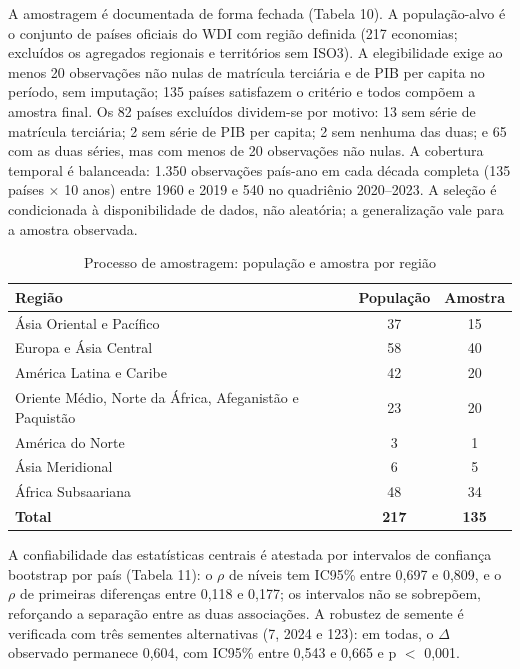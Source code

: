 \documentclass[12pt,a4paper]{article}
\begin{document}
A amostragem é documentada de forma fechada (Tabela 10). A população-alvo é o conjunto de países oficiais do WDI com região definida (217 economias; excluídos os agregados regionais e territórios sem ISO3). A elegibilidade exige ao menos 20 observações não nulas de matrícula terciária e de PIB per capita no período, sem imputação; 135 países satisfazem o critério e todos compõem a amostra final. Os 82 países excluídos dividem-se por motivo: 13 sem série de matrícula terciária; 2 sem série de PIB per capita; 2 sem nenhuma das duas; e 65 com as duas séries, mas com menos de 20 observações não nulas. A cobertura temporal é balanceada: 1.350 observações país-ano em cada década completa (135 países $\times$ 10 anos) entre 1960 e 2019 e 540 no quadriênio 2020--2023. A seleção é condicionada à disponibilidade de dados, não aleatória; a generalização vale para a amostra observada.

\begin{table}[htbp]
\centering
\caption{Processo de amostragem: população e amostra por região}
\label{tab:amostragem}
\small
\begin{tabular}{>{\raggedright\arraybackslash}p{6.0cm}cc}
\toprule
Região & População & Amostra \\
\midrule
Ásia Oriental e Pacífico & 37 & 15 \\
Europa e Ásia Central & 58 & 40 \\
América Latina e Caribe & 42 & 20 \\
Oriente Médio, Norte da África, Afeganistão e Paquistão & 23 & 20 \\
América do Norte & 3 & 1 \\
Ásia Meridional & 6 & 5 \\
África Subsaariana & 48 & 34 \\
\textbf{Total} & \textbf{217} & \textbf{135} \\
\bottomrule
\end{tabular}
\par{}
\end{table}

A confiabilidade das estatísticas centrais é atestada por intervalos de confiança bootstrap por país (Tabela 11): o $\rho$ de níveis tem IC95\% entre 0,697 e 0,809, e o $\rho$ de primeiras diferenças entre 0,118 e 0,177; os intervalos não se sobrepõem, reforçando a separação entre as duas associações. A robustez de semente é verificada com três sementes alternativas (7, 2024 e 123): em todas, o $\Delta$ observado permanece 0,604, com IC95\% entre 0,543 e 0,665 e p $<$ 0,001.
\end{document}

